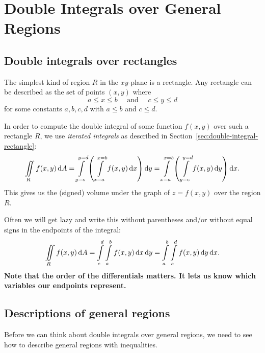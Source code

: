 \newlecture
\setcounter{chapter}{11}
\setcounter{section}{2}

\def\coursetopicnumber{III}
\def\topic{Double Integrals over General Regions} %
\def\shorttopic{Double integrals, general regions} %
\def\textbookname{Active Calculus} %
\def\shorttextbookname{AC} %
\def\textbooksection{11.3} %
\def\textbooksectionurl{https://activecalculus.org/vector/S-11-3-Double-Integrals-General.html} %
\def\handoutday{} %


\thispagestyle{plain}
\topstuff
\section{\topic{} \booklink{}}
\label{sec:double-int-general-region}

\subsection{Double integrals over rectangles}
The simplest kind of region $R$ in the $xy$-plane is a rectangle. Any rectangle can be described as the set of points $(x,y)$ where 
\[
    a\le x\le b \quad \text{ and } \quad c\le y\le d
\] 
for some constants $a,b,c,d$ with $a\le b$ and $c\le d$. 

In order to compute the double integral of some function $f(x,y)$ over such a rectangle $R$, we use \emph{iterated integrals} as described in Section~\ref{sec:double-integral-rectangle}:
\[
    \iint\limits_R f(x,y)\mathop{}\!\mathrm{d} A 
    = \int\limits_{y=c}^{y=d} \left(\,\int\limits_{x=a}^{x=b} f(x,y)\mathop{}\!\mathrm{d} x\right) \mathop{}\!\mathrm{d} y 
    = \int\limits_{x=a}^{x=b}\left(\,\int\limits_{y=c}^{y=d} f(x,y)\mathop{}\!\mathrm{d} y\right)\mathop{}\!\mathrm{d} x.
\] 
This gives us the (signed) volume under the graph of $z=f(x,y)$ over the region $R$.

Often we will get lazy and write this without parentheses and/or without equal signs in the endpoints of the integral:
\[
    \iint\limits_R f(x,y)\mathop{}\!\mathrm{d} A 
    = \int\limits_{c}^{d} \int\limits_{a}^{b} f(x,y)\mathop{}\!\mathrm{d} x \mathop{}\!\mathrm{d} y 
    = \int\limits_{a}^{b} \int\limits_{c}^{d} f(x,y)\mathop{}\!\mathrm{d} y \mathop{}\!\mathrm{d} x .
\] 
\textbf{Note that the order of the differentials matters. It lets us know which variables our endpoints represent.}

\subsection{Descriptions of general regions}
Before we can think about double integrals over general regions, we need to see how to describe general regions with inequalities.

